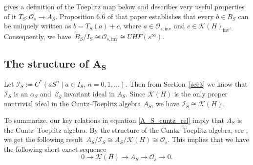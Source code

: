 \documentclass[pdftex]{sigma}
\numberwithin{equation}{section}
\begin{document}
\cite[Section 6.4]{HKMP3} gives a definition of the Toeplitz map below and describes very useful properties of it
$
T_S\colon \mathcal{O}_s\to A_S$.
Proposition 6.6 of that paper establishes that every $b\in B_S$ can be uniquely written as
$
b=T_S(a)+c$,
where $a\in \mathcal{O}_{s,\mathrm{inv}}$ and $c\in \mathcal{K}(H)_{\mathrm{inv}}$. Consequently,
we have~${
B_S/I_S\cong \mathcal{O}_{s,\mathrm{inv}} \cong UHF(s^\infty)}$.

\subsection[The structure of A\_S]{The structure of $\boldsymbol{A_S}$}
Let $\mathcal{I}_S := C^*(aS^n \mid a\in I_S,\, n=0,1,\dots)$. Then from Section~\ref{sec3} we know that $\mathcal{I}_S$ is an $\alpha_S$ and~$\beta_S$ invariant ideal in $A_S$. Since $\mathcal{K}(H)$ is the only proper nontrivial ideal in the Cuntz--Toeplitz algebra $A_S$, we have
$
\mathcal{I}_S\cong \mathcal{K}(H)$.

To summarize, our key relations in equation \eqref{A_S_cuntz_rel} imply that $A_S$ is the Cuntz--Toeplitz algebra. By the structure of the Cuntz--Toeplitz algebra, see \cite[Lemma V.5.2]{KD},
we get the following result~${
A_S/\mathcal{I}_S\cong A_S/\mathcal{K}(H)\cong\mathcal{O}_s}$.
This implies that we have the following short exact sequence
\begin{equation}\label{ses-As}
0\rightarrow\mathcal{K}(H)\rightarrow A_S\rightarrow\mathcal{O}_s\rightarrow 0.
\end{equation}
\end{document}
